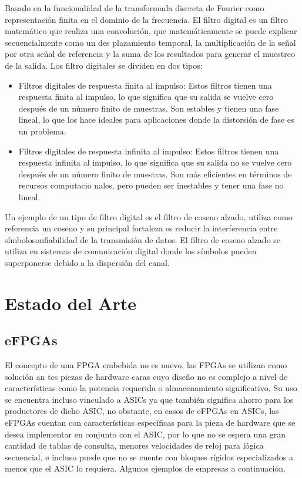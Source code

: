 Basado en la funcionalidad de la transformada discreta de Fourier como representación
finita en el dominio de la frecuencia. El filtro digital es un filtro matemático que realiza
una convolución, que matemáticamente se puede explicar secuencialmente como un des
plazamiento temporal, la multiplicación de la señal por otra señal de referencia y la suma
de los resultados para generar el muestreo de la salida. Los filtro digitales se dividen en
dos tipos:
\begin{itemize}

    \item Filtros digitales de respuesta finita al impulso: Estos filtros tienen una respuesta
finita al impulso, lo que significa que su salida se vuelve cero después de un número
finito de muestras. Son estables y tienen una fase lineal, lo que los hace ideales para
aplicaciones donde la distorsión de fase es un problema.\cite{proakis1996digital}

    \item Filtros digitales de respuesta infinita al impulso: Estos filtros tienen una respuesta
infinita al impulso, lo que significa que su salida no se vuelve cero después de un
número finito de muestras. Son más eficientes en términos de recursos computacio
nales, pero pueden ser inestables y tener una fase no lineal.\cite{proakis1996digital}

\end{itemize}

Un ejemplo de un tipo de filtro digital es el filtro de coseno alzado, utiliza como referencia
un coseno y su principal fortaleza es reducir la interferencia entre símbolosonfiabilidad de
la transmisión de datos. El filtro de coseno alzado se utiliza en sistemas de comunicación
digital donde los símbolos pueden superponerse debido a la dispersión del canal.
\cite{proakis1996digital}

\section{Estado del Arte}

\subsection{eFPGAs}

El concepto de una FPGA embebida no es nuevo, las FPGAs se utilizan como solución an
tes piezas de hardware caras cuyo diseño no es complejo a nivel de características como la
potencia requerida o almacenamiento significativo. Su uso se encuentra incluso vinculado
a ASICs ya que también significa ahorro para los productores de dicho ASIC, no obstante,
en casos de eFPGAs en ASICs, las eFPGAs cuentan con características específicas para
la pieza de hardware que se desea implementar en conjunto con el ASIC, por lo que no se
espera una gran cantidad de tablas de consulta, menores velocidades de reloj para lógica
secuencial, e incluso puede que no se cuente con bloques rígidos especializados a menos
que el ASIC lo requiera. Algunos ejemplos de empresas a continuación.\cite{saidi2018survey}

